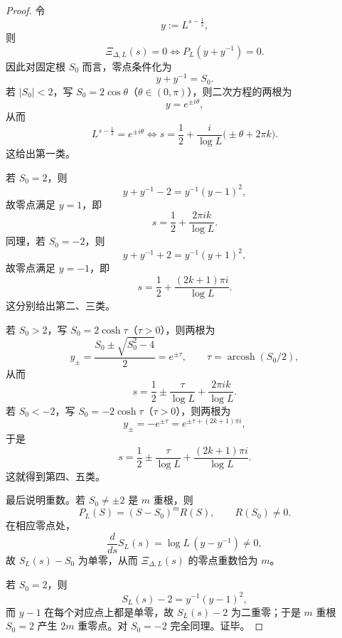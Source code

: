 \begin{proof}
令
\[
y:=L^{s-\frac12},
\]
则
\[
\Xi_{\Delta,L}(s)=0
\iff
P_L(y+y^{-1})=0.
\]
因此对固定根 \(S_0\) 而言，零点条件化为
\[
y+y^{-1}=S_0.
\]
若 \(|S_0|<2\)，写 \(S_0=2\cos\theta\)（\(\theta\in(0,\pi)\)），则二次方程的两根为
\[
y=e^{\pm i\theta},
\]
从而
\[
L^{s-\frac12}=e^{\pm i\theta}
\iff
s=\frac12+\frac{i}{\log L}\bigl(\pm\theta+2\pi k\bigr).
\]
这给出第一类。

若 \(S_0=2\)，则
\[
y+y^{-1}-2=y^{-1}(y-1)^2,
\]
故零点满足 \(y=1\)，即
\[
s=\frac12+\frac{2\pi i k}{\log L}.
\]
同理，若 \(S_0=-2\)，则
\[
y+y^{-1}+2=y^{-1}(y+1)^2,
\]
故零点满足 \(y=-1\)，即
\[
s=\frac12+\frac{(2k+1)\pi i}{\log L}.
\]
这分别给出第二、三类。

若 \(S_0>2\)，写 \(S_0=2\cosh\tau\)（\(\tau>0\)），则两根为
\[
y_\pm=\frac{S_0\pm\sqrt{S_0^2-4}}{2}=e^{\pm\tau},
\qquad
\tau=\operatorname{arcosh}(S_0/2),
\]
从而
\[
s=\frac12\pm \frac{\tau}{\log L}+\frac{2\pi i k}{\log L}.
\]
若 \(S_0<-2\)，写 \(S_0=-2\cosh\tau\)（\(\tau>0\)），则两根为
\[
y_\pm=-e^{\pm\tau}=e^{\pm\tau+(2k+1)\pi i},
\]
于是
\[
s=\frac12\pm \frac{\tau}{\log L}+\frac{(2k+1)\pi i}{\log L}.
\]
这就得到第四、五类。

最后说明重数。若 \(S_0\neq\pm2\) 是 \(m\) 重根，则
\[
P_L(S)=(S-S_0)^m R(S),\qquad R(S_0)\neq 0.
\]
在相应零点处，
\[
\frac{d}{ds}S_L(s)=\log L\,(y-y^{-1})\neq 0,
\]
故 \(S_L(s)-S_0\) 为单零，从而 \(\Xi_{\Delta,L}(s)\) 的零点重数恰为 \(m\)。

若 \(S_0=2\)，则
\[
S_L(s)-2=y^{-1}(y-1)^2,
\]
而 \(y-1\) 在每个对应点上都是单零，故 \(S_L(s)-2\) 为二重零；于是 \(m\) 重根 \(S_0=2\) 产生 \(2m\) 重零点。对 \(S_0=-2\) 完全同理。证毕。
\end{proof}

